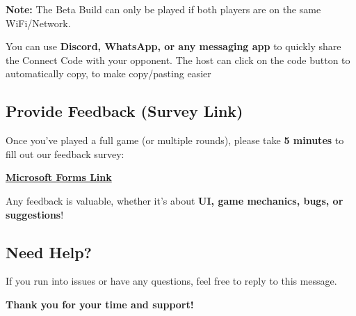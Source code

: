 \documentclass{article}
\begin{document}
\textbf{Note:} The Beta Build can only be played if both players are on the same WiFi/Network.

\begin{tcolorbox}[colback=gray!10, colframe=black, title=Tip]
You can use \textbf{Discord, WhatsApp, or any messaging app} to quickly share the Connect Code with your opponent.
The host can click on the code button to automatically copy, to make copy/pasting easier
\end{tcolorbox}

\subsection{Provide Feedback (Survey Link)}

Once you’ve played a full game (or multiple rounds), please take \textbf{5 minutes} to fill out our feedback survey:

\href{https://forms.office.com/r/nYjE7qfsYG}{\textbf{Microsoft Forms Link}}

Any feedback is valuable, whether it's about \textbf{UI, game mechanics, bugs, or suggestions}!

\subsection{Need Help?}
If you run into issues or have any questions, feel free to reply to this message.

\bigskip

\begin{center}
\textbf{Thank you for your time and support!}
\end{center}
\end{document}
